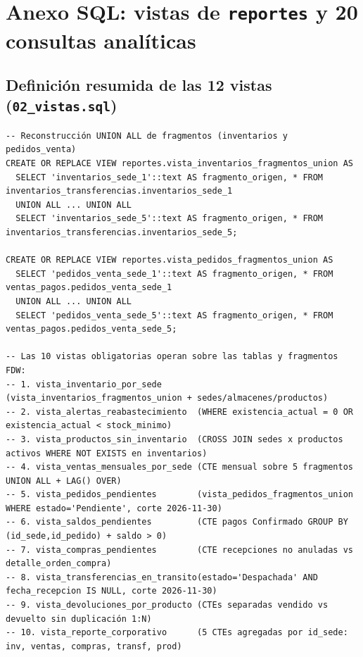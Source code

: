 \documentclass[11pt,oneside]{article}
\begin{document}
\section{Anexo SQL: vistas de \texttt{reportes} y 20 consultas anal\'iticas}

\subsection{Definici\'on resumida de las 12 vistas (\texttt{02\_vistas.sql})}
\begin{lstlisting}
-- Reconstrucción UNION ALL de fragmentos (inventarios y pedidos_venta)
CREATE OR REPLACE VIEW reportes.vista_inventarios_fragmentos_union AS
  SELECT 'inventarios_sede_1'::text AS fragmento_origen, * FROM inventarios_transferencias.inventarios_sede_1
  UNION ALL ... UNION ALL
  SELECT 'inventarios_sede_5'::text AS fragmento_origen, * FROM inventarios_transferencias.inventarios_sede_5;

CREATE OR REPLACE VIEW reportes.vista_pedidos_fragmentos_union AS
  SELECT 'pedidos_venta_sede_1'::text AS fragmento_origen, * FROM ventas_pagos.pedidos_venta_sede_1
  UNION ALL ... UNION ALL
  SELECT 'pedidos_venta_sede_5'::text AS fragmento_origen, * FROM ventas_pagos.pedidos_venta_sede_5;

-- Las 10 vistas obligatorias operan sobre las tablas y fragmentos FDW:
-- 1. vista_inventario_por_sede       (vista_inventarios_fragmentos_union + sedes/almacenes/productos)
-- 2. vista_alertas_reabastecimiento  (WHERE existencia_actual = 0 OR existencia_actual < stock_minimo)
-- 3. vista_productos_sin_inventario  (CROSS JOIN sedes x productos activos WHERE NOT EXISTS en inventarios)
-- 4. vista_ventas_mensuales_por_sede (CTE mensual sobre 5 fragmentos UNION ALL + LAG() OVER)
-- 5. vista_pedidos_pendientes        (vista_pedidos_fragmentos_union WHERE estado='Pendiente', corte 2026-11-30)
-- 6. vista_saldos_pendientes         (CTE pagos Confirmado GROUP BY (id_sede,id_pedido) + saldo > 0)
-- 7. vista_compras_pendientes        (CTE recepciones no anuladas vs detalle_orden_compra)
-- 8. vista_transferencias_en_transito(estado='Despachada' AND fecha_recepcion IS NULL, corte 2026-11-30)
-- 9. vista_devoluciones_por_producto (CTEs separadas vendido vs devuelto sin duplicación 1:N)
-- 10. vista_reporte_corporativo      (5 CTEs agregadas por id_sede: inv, ventas, compras, transf, prod)
\end{lstlisting}
\end{document}
